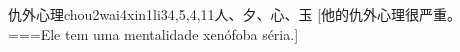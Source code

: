 \begin{EntryWithPhonetic}{仇外心理}{chou2wai4xin1li3}{4,5,4,11}{⼈、⼣、⼼、⽟}
  [他的仇外心理很严重。===Ele tem uma mentalidade xenófoba séria.]
\end{EntryWithPhonetic}
